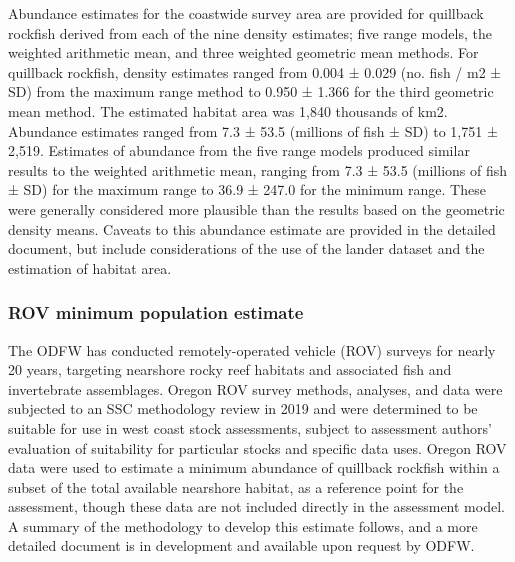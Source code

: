 \documentclass[11pt,
  english,
  a4paper,
]{article}
\begin{document}
\leavevmode\tagmcend\tagstructend\par


Abundance estimates for the coastwide survey area are provided for quillback rockfish derived from each of the nine density estimates; five range models, the weighted arithmetic mean, and three weighted geometric mean methods. For quillback rockfish, density estimates ranged from 0.004 ± 0.029 (no. fish / m2 ± SD) from the maximum range method to 0.950 ± 1.366 for the third geometric mean method. The estimated habitat area was 1,840 thousands of km2. Abundance estimates ranged from 7.3 ± 53.5 (millions of fish ± SD) to 1,751 ± 2,519. Estimates of abundance from the five range models produced similar results to the weighted arithmetic mean, ranging from 7.3 ± 53.5 (millions of fish ± SD) for the maximum range to 36.9 ± 247.0 for the minimum range. These were generally considered more plausible than the results based on the geometric density means. Caveats to this abundance estimate are provided in the detailed document, but include considerations of the use of the lander dataset and the estimation of habitat area.

\leavevmode\tagmcend\tagstructend\par


\hypertarget{rov-minimum-population-estimate}{%
\subsubsection{ROV minimum population estimate}\label{rov-minimum-population-estimate}}

\leavevmode\tagmcend\tagstructend


The ODFW has conducted remotely-operated vehicle (ROV) surveys for nearly 20 years, targeting nearshore rocky reef habitats and associated fish and invertebrate assemblages. Oregon ROV survey methods, analyses, and data were subjected to an SSC methodology review in 2019 and were determined to be suitable for use in west coast stock assessments, subject to assessment authors' evaluation of suitability for particular stocks and specific data uses. Oregon ROV data were used to estimate a minimum abundance of quillback rockfish within a subset of the total available nearshore habitat, as a reference point for the assessment, though these data are not included directly in the assessment model. A summary of the methodology to develop this estimate follows, and a more detailed document is in development and available upon request by ODFW.
\end{document}
